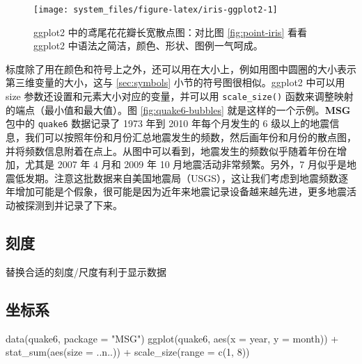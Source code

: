 \documentclass[
  b5paper,
  UTF8,twoside]{book}
\newenvironment{Shaded}{\begin{snugshade}}{\end{snugshade}}
\newcommand{\AttributeTok}[1]{\textcolor[rgb]{0.77,0.63,0.00}{#1}}
\newcommand{\DecValTok}[1]{\textcolor[rgb]{0.00,0.00,0.81}{#1}}
\newcommand{\FunctionTok}[1]{\textcolor[rgb]{0.00,0.00,0.00}{#1}}
\newcommand{\NormalTok}[1]{#1}
\newcommand{\SpecialCharTok}[1]{\textcolor[rgb]{0.00,0.00,0.00}{#1}}
\newcommand{\StringTok}[1]{\textcolor[rgb]{0.31,0.60,0.02}{#1}}
\begin{document}
\begin{figure}

{\centering \texttt{[image: system\_files/figure-latex/iris-ggplot2-1]} 

}

\caption[ggplot2 中的鸢尾花花瓣长宽散点图]{ggplot2 中的鸢尾花花瓣长宽散点图：对比图 \ref{fig:point-iris} 看看 ggplot2 中语法之简洁，颜色、形状、图例一气呵成。}\label{fig:iris-ggplot2}
\end{figure}





标度除了用在颜色和符号上之外，还可以用在大小上，例如用图中圆圈的大小表示第三维变量的大小，这与 \ref{sec:symbols} 小节的符号图很相似。ggplot2 中可以用 size 参数还设置和元素大小对应的变量，并可以用 \texttt{scale\_size()} 函数来调整映射的端点（最小值和最大值）。图 \ref{fig:quake6-bubbles} 就是这样的一个示例。\textbf{MSG} 包中的 \texttt{quake6} 数据记录了 1973 年到 2010 年每个月发生的 6 级以上的地震信息，我们可以按照年份和月份汇总地震发生的频数，然后画年份和月份的散点图，并将频数信息附着在点上。从图中可以看到，地震发生的频数似乎随着年份在增加，尤其是 2007 年 4 月和 2009 年 10 月地震活动非常频繁。另外，7 月似乎是地震低发期。注意这批数据来自美国地震局（USGS），这让我们考虑到地震频数逐年增加可能是个假象，很可能是因为近年来地震记录设备越来越先进，更多地震活动被探测到并记录了下来。

\hypertarget{subsec:scale}{%
\subsection{刻度}\label{subsec:scale}}

替换合适的刻度/尺度有利于显示数据

\hypertarget{ux5750ux6807ux7cfb}{%
\subsection{坐标系}\label{ux5750ux6807ux7cfb}}

\begin{Shaded}
\begin{Highlighting}[]
\FunctionTok{data}\NormalTok{(quake6, }\AttributeTok{package =} \StringTok{"MSG"}\NormalTok{)}
\FunctionTok{ggplot}\NormalTok{(quake6, }\FunctionTok{aes}\NormalTok{(}\AttributeTok{x =}\NormalTok{ year, }\AttributeTok{y =}\NormalTok{ month)) }\SpecialCharTok{+}
  \FunctionTok{stat\_sum}\NormalTok{(}\FunctionTok{aes}\NormalTok{(}\AttributeTok{size =}\NormalTok{ ..n..)) }\SpecialCharTok{+} \FunctionTok{scale\_size}\NormalTok{(}\AttributeTok{range =} \FunctionTok{c}\NormalTok{(}\DecValTok{1}\NormalTok{, }\DecValTok{8}\NormalTok{))}
\end{Highlighting}
\end{Shaded}
\end{document}
